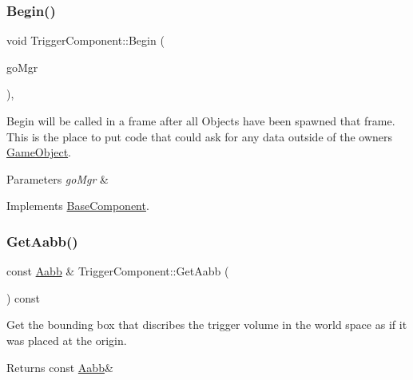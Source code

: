 \subsubsection{\texorpdfstring{Begin()}{Begin()}}
{\footnotesize\ttfamily void Trigger\+Component\+::\+Begin (\begin{DoxyParamCaption}\item[{\hyperlink{classGameObjectManager}{Game\+Object\+Manager} $\ast$}]{go\+Mgr }\end{DoxyParamCaption})\hspace{0.3cm}{\ttfamily [override]}, {\ttfamily [virtual]}}



Begin will be called in a frame after all Objects have been spawned that frame. This is the place to put code that could ask for any data outside of the owner\textquotesingle{}s \hyperlink{classGameObject}{Game\+Object}. 


\begin{DoxyParams}{Parameters}
{\em go\+Mgr} & \\
\hline
\end{DoxyParams}


Implements \hyperlink{classBaseComponent}{Base\+Component}.

\mbox{\label{classTriggerComponent_ae88aa2832f7e3f5bd90779c9ef7ebfb9}} 
\subsubsection{\texorpdfstring{Get\+Aabb()}{GetAabb()}}
{\footnotesize\ttfamily const \hyperlink{classAabb}{Aabb} \& Trigger\+Component\+::\+Get\+Aabb (\begin{DoxyParamCaption}{ }\end{DoxyParamCaption}) const}



Get the bounding box that discribes the trigger volume in the world space as if it was placed at the origin. 

\begin{DoxyReturn}{Returns}
const \hyperlink{classAabb}{Aabb}\& 
\end{DoxyReturn}
\mbox{\label{classTriggerComponent_ac94c9219efe3efa94cef732485115a46}} 

